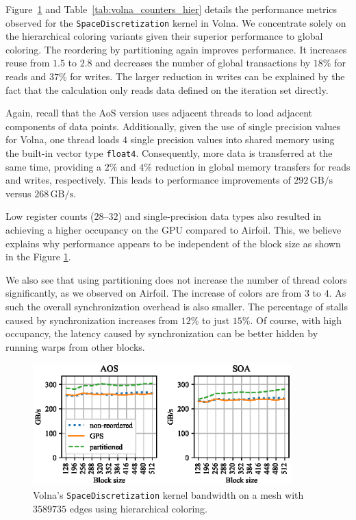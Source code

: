 Figure~\ref{fig:volna_bw-vs-bs_hier} and Table~\ref{tab:volna_counters_hier} 
details the performance metrics observed for the \texttt{SpaceDiscretization} 
kernel in Volna. We concentrate solely on the hierarchical coloring variants 
given their superior performance to global coloring. The reordering by 
partitioning again improves performance. It increases reuse from $1.5$ to 
$2.8$ and decreases the number of global transactions by $18\%$ for reads and 
$37\%$ for writes. The larger reduction in writes can be explained by the fact 
that the calculation only reads data defined on the iteration set directly.

Again, recall that the AoS version uses adjacent threads to load adjacent 
components of data points. Additionally, given the use of single precision 
values for Volna, one thread loads $4$ single precision values into shared 
memory using the built-in vector type \lstinline!float4!. Consequently, more 
data is transferred at the same time, providing a $2\%$ and $4\%$ reduction
in global memory transfers for reads and writes, respectively. This leads 
to performance improvements of $292\,\text{GB/s}$ versus $268\,\text{GB/s}$.

Low register counts ($28$--$32$) and single-precision data types also 
resulted in achieving a higher occupancy on the GPU compared to Airfoil. This, 
we believe explains why performance appears to be independent of the block size 
as shown in the Figure \ref{fig:volna_bw-vs-bs_hier}. 

We also see that using partitioning does not increase the number of thread 
colors significantly, as we observed on Airfoil. The increase of colors are 
from $3$ to $4$. As such the overall synchronization overhead is also smaller. 
The percentage of stalls caused by synchronization increases from $12\%$ to just 
$15\%$. Of course, with high occupancy, the latency caused by synchronization 
can be better hidden by running warps from other blocks. 


\begin{figure}[Htbp]
  \centering
  \includegraphics[width=10cm]{fig/volna_bw-vs-bs_hier.eps}
  \caption{Volna's \texttt{SpaceDiscretization} kernel bandwidth on a mesh with
  $3589735$ edges using hierarchical coloring.}
  \label{fig:volna_bw-vs-bs_hier}
\end{figure}

